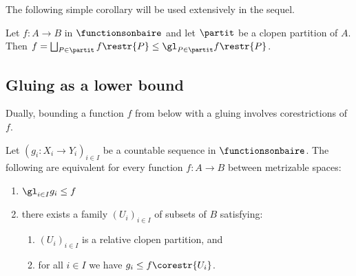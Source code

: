 The following simple corollary will be used extensively in the sequel.

\begin{corollary}\label{Gluingasupperbound_cor}
Let $f:A\to B$ in $\functionsonbaire$ and let $\partit$ be a clopen partition of $A$.
Then $f=\bigsqcup_{P\in\partit} f\restr{P}\leq \gl_{P\in\partit} f\restr{P}$.
\end{corollary}

\subsection{Gluing as a lower bound}
Dually, bounding a function $f$ from below with a gluing involves corestrictions of $f$.

\begin{Proposition}\label{Gluingaslowerbound}
Let $(g_i:X_i\to Y_i)_{i\in I}$ be a countable sequence in $\functionsonbaire$.
The following are equivalent for every function $f:A\to B$ between metrizable spaces:
\begin{enumerate}
\item $\gl_{i\in I}g_i\leq f$
\item there exists a family $(U_i)_{i\in I}$ of subsets of $B$ satisfying:
\begin{enumerate}
\item $(U_i)_{i\in I}$ is a relative clopen partition, and
\item for all $i\in I$ we have $g_i\leq f\corestr{U_i}$.
\end{enumerate}
\end{enumerate}
\end{Proposition}

